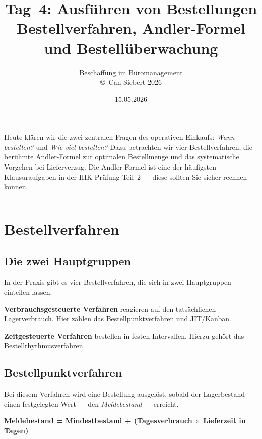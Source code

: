 \documentclass[11pt, a4paper]{article}
\title{\vspace*{-1.5cm}\Huge\bfseries\color{bfwPrimaryDark}Tag~4: Ausführen von Bestellungen\\[0.4em]
  \large\color{bfwInkSoft}\textnormal{Bestellverfahren, Andler-Formel und Bestellüberwachung}}
\author{\textsf{Beschaffung im Büromanagement}\\
\textsf{\small\copyright\ Can Siebert\,\textperiodcentered\,2026}}
\date{15.05.2026}
\begin{document}
\maketitle
\thispagestyle{empty}

\vspace{1em}
\begin{merksatz}[title={\bfseries Worum geht es heute?}]
Heute klären wir die zwei zentralen Fragen des operativen Einkaufs: \emph{Wann
bestellen?} und \emph{Wie viel bestellen?} Dazu betrachten wir vier Bestellverfahren,
die berühmte Andler-Formel zur optimalen Bestellmenge und das systematische Vorgehen
bei Lieferverzug. Die Andler-Formel ist eine der häufigsten Klausuraufgaben in der
IHK-Prüfung Teil~2 --- diese sollten Sie sicher rechnen können.
\end{merksatz}

\tableofcontents
\vspace{1em}
\hrule
\vspace{1em}

\section{Bestellverfahren}

\subsection{Die zwei Hauptgruppen}

In der Praxis gibt es vier Bestellverfahren, die sich in zwei Hauptgruppen einteilen
lassen:

\textbf{Verbrauchsgesteuerte Verfahren} reagieren auf den tatsächlichen Lagerverbrauch.
Hier zählen das Bestellpunktverfahren und JIT/Kanban.

\textbf{Zeitgesteuerte Verfahren} bestellen in festen Intervallen. Hierzu gehört das
Bestellrhythmusverfahren.

\subsection{Bestellpunktverfahren}

Bei diesem Verfahren wird eine Bestellung ausgelöst, sobald der Lagerbestand einen
festgelegten Wert --- den \emph{Meldebestand} --- erreicht.

\begin{merksatz}[title={Formel}]
\textbf{Meldebestand = Mindestbestand + (Tagesverbrauch $\times$ Lieferzeit in Tagen)}
\end{merksatz}
\end{document}
